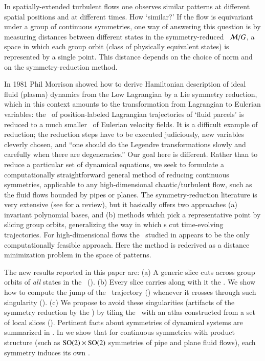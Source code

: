 \documentclass[preprint,12pt]{elsarticle} %
\begin{document}
In spatially-extended turbulent flows one observes similar patterns at
different spatial positions and at different times. How `similar?' If the
flow is equivariant under a group of continuous symmetries, one way of
answering this question is by measuring distances between different
states in the symmetry-reduced \statesp\ ${\cal M}/G$, a space in which
each group orbit (class of physically equivalent states) is represented
by a single point. This distance depends on the choice of norm and on
the symmetry-reduction method.

													\toCB
In 1981 Phil Morrison showed how to derive Hamiltonian
description of ideal fluid (plasma) dynamics from the Low
Lagrangian by a Lie symmetry reduction, which in this context
amounts to the transformation from Lagrangian to Eulerian variables: the
\statesp\ of position-labeled Lagrangian trajectories of `fluid parcels'
is reduced to a much smaller \statesp\ of Eulerian velocity
fields. It is a
difficult example of reduction; the reduction steps have to be
executed judiciously, new variables cleverly chosen, and ``one should do
the Legendre transformations slowly and carefully when there are
degeneracies.'' Our goal here is different. Rather than to
reduce a particular set of dynamical equations, we seek to formulate a
computationally straightforward general method of reducing continuous
symmetries, applicable to any high-dimensional chaotic/turbulent flow,
such as the fluid flows bounded by pipes or planes. The
symmetry-reduction literature is very extensive (see
 for a review), but it basically offers two
approaches (a) invariant polynomial bases, and (b) methods which pick a
representative point by slicing group orbits, generalizing the way in
which {\PoincSec}s cut time-evolving trajectories. For high-dimensional
flows the \mslices\ studied in 
appears to be the only computationally feasible approach. Here
the method is rederived as a distance minimization problem in the space
of patterns.

The new results reported in this paper are:
    (a) A generic slice cuts across group orbits of {\em all}
        states in the \statesp\ ().
    (b) Every slice carries along with it the {\sset}. We show how to
        compute the jump of the \reducedsp\ trajectory
         () whenever it crosses
        through such singularity  ().
    (c) We propose to avoid these singularities (artifacts of the symmetry
        reduction by the \mslices) by tiling the \statesp\ with an atlas
        constructed from a set of local slices  ().
Pertinent facts about symmetries of dynamical systems are summarized in
. In   we show that for
continuous symmetries with product structure (such as $\textrm{SO}(2) \times
\textrm{SO}(2)$ symmetries of pipe and plane fluid flows), each symmetry induces
its own {\sset}.
\end{document}
